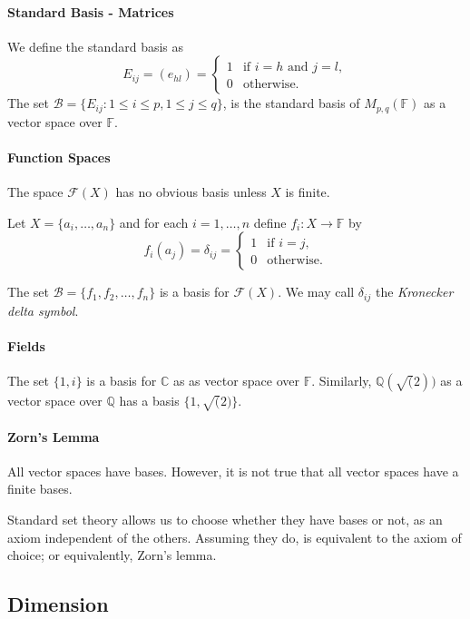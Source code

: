 \paragraph{Standard Basis - Matrices}
We define the standard basis as
\[
    E_{ij} = (e_{hl}) =  \begin{cases}
        1 & \text{if } i = h \text{ and } j = l, \\
        0 & \text{otherwise}.
    \end{cases}
\]
The set \(\mathcal{B} = 
    \{
        E_{ij} : 1 \leq i \leq p, 1\leq j \leq q 
    \}
\),
is the standard basis of \(M_{p, q}(\mathbb{F})\) as a vector space
over \(\mathbb{F}\).

\paragraph{Function Spaces}
The space \(\mathcal{F}(X)\) has no obvious basis unless \(X\)
is finite.

Let \(X = \{a_i, \dots, a_n\}\) and for each \(i = 1,\dots, n\)
define \(f_i:X\to \mathbb{F}\) by
\[
    f_{i}(a_j) = \delta_{ij} = \begin{cases}
        1 & \text{if } i = j, \\
        0 & \text{otherwise}.
    \end{cases}
\]

The set \(\mathcal{B} = \{f_1, f_2, \dots, f_n\}\) is a basis for
\(\mathcal{F}(X)\).
We may call \(\delta_{ij}\) the \textit{Kronecker delta symbol}.

\paragraph{Fields}
The set \(\{1, i\}\) is a basis for \(\mathbb{C}\) as as vector
space over \(\mathbb{F}\).
Similarly, \(\mathbb{Q}(\sqrt(2))\) as a vector space over \(\mathbb{Q}\)
has a basis \(\{1, \sqrt(2)\}\).

\paragraph{Zorn's Lemma}
All vector spaces have bases. However, it is not true that all vector
spaces have a finite bases.

Standard set theory allows us to choose whether they have bases or not,
as an axiom independent of the others. Assuming they do, is equivalent to
the axiom of choice; or equivalently, Zorn's lemma.

\subsection{Dimension}

